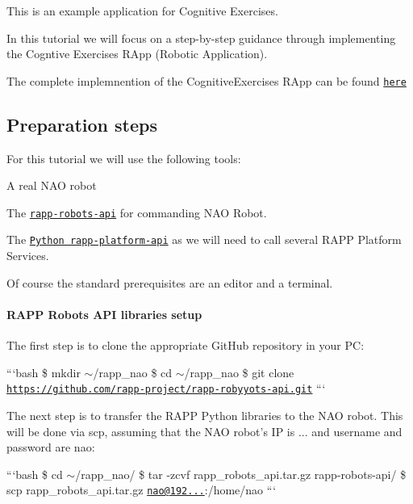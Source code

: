 This is an example application for Cognitive Exercises.

In this tutorial we will focus on a step-\/by-\/step guidance through implementing the Cogntive Exercises R\-App (Robotic Application).

The complete implemnention of the Cognitive\-Exercises R\-App can be found \href{https://github.com/rapp-project/rapp-applications-nao/tree/cognitive/nao/cognitiveExercises}{\tt here}

\subsection*{Preparation steps}

For this tutorial we will use the following tools\-:
\begin{DoxyItemize}
\item A real N\-A\-O robot
\item The \href{https://github.com/rapp-project/rapp-robots-api}{\tt rapp-\/robots-\/api} for commanding N\-A\-O Robot.
\item The \href{https://github.com/rapp-project/rapp-api/tree/master/python}{\tt Python rapp-\/platform-\/api} as we will need to call several R\-A\-P\-P Platform Services.
\end{DoxyItemize}

Of course the standard prerequisites are an editor and a terminal.

\paragraph*{R\-A\-P\-P Robots A\-P\-I libraries setup}

The first step is to clone the appropriate Git\-Hub repository in your P\-C\-:

```bash \$ mkdir $\sim$/rapp\-\_\-nao \$ cd $\sim$/rapp\-\_\-nao \$ git clone \href{https://github.com/rapp-project/rapp-robyyots-api.git}{\tt https\-://github.\-com/rapp-\/project/rapp-\/robyyots-\/api.\-git} ```

The next step is to transfer the R\-A\-P\-P Python libraries to the N\-A\-O robot. This will be done via {\ttfamily scp}, assuming that the N\-A\-O robot's I\-P is {...} and username and password are {\ttfamily nao}\-:

```bash \$ cd $\sim$/rapp\-\_\-nao/ \$ tar -\/zcvf rapp\-\_\-robots\-\_\-api.\-tar.\-gz rapp-\/robots-\/api/ \$ scp rapp\-\_\-robots\-\_\-api.\-tar.\-gz \href{mailto:nao@192.168.0.101}{\tt nao@192...}\-:/home/nao ```

